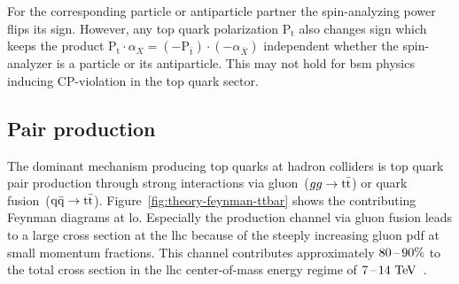 
For the corresponding particle or antiparticle partner the spin-analyzing power flips its sign. However, any top quark polarization $\mathrm{P}_\mathrm{t}$ also changes sign which keeps the product $\mathrm{P}_\mathrm{t}\cdot\alpha_{X}=(-\mathrm{P}_{\bar{\mathrm{t}}})\cdot(-\alpha_{\bar{X}})$ independent whether the spin-analyzer is a particle or its antiparticle. This may not hold for \gls{bsm} physics inducing CP-violation in the top quark sector.


\subsection{Pair production}

The dominant mechanism producing top quarks at hadron colliders is top quark pair production through strong interactions via gluon~($gg\to\mathrm{t}\bar{\mathrm{t}}$) or quark fusion~($\mathrm{q}\bar{\mathrm{q}}\to\mathrm{t}\bar{\mathrm{t}}$). Figure~\ref{fig:theory-feynman-ttbar} shows the contributing Feynman diagrams at \gls{lo}. Especially the production channel via gluon fusion leads to a large cross section at the \gls{lhc} because of the steeply increasing gluon \gls{pdf} at small momentum fractions. This channel contributes approximately $80\,\text{--}\,90\%$ to the total cross section in the \gls{lhc} center-of-mass energy regime of $7\,\text{--}\,14~\mathrm{TeV}$~\cite{Olive:2016xmw}. 

